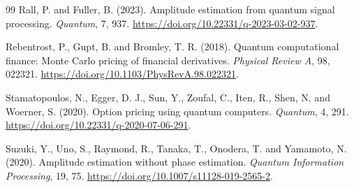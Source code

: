 \documentclass[11pt]{article}
\begin{document}
\begin{thebibliography}{99}
 Rall, P. and Fuller, B. (2023). Amplitude estimation from quantum signal processing. \emph{Quantum}, 7, 937. \url{https://doi.org/10.22331/q-2023-03-02-937}.

Rebentrost, P., Gupt, B. and Bromley, T. R. (2018).
Quantum computational finance: Monte Carlo pricing of financial derivatives.
\emph{Physical Review A}, 98, 022321.
\url{https://doi.org/10.1103/PhysRevA.98.022321}.

 Stamatopoulos, N., Egger, D. J., Sun, Y., Zoufal, C., Iten, R., Shen, N. and Woerner, S. (2020). Option pricing using quantum computers. \emph{Quantum}, 4, 291. \url{https://doi.org/10.22331/q-2020-07-06-291}.

Suzuki, Y., Uno, S., Raymond, R., Tanaka, T., Onodera, T. and Yamamoto, N. (2020).
Amplitude estimation without phase estimation. \emph{Quantum Information Processing}, 19, 75.
\url{https://doi.org/10.1007/s11128-019-2565-2}.
\end{thebibliography}
\end{document}
